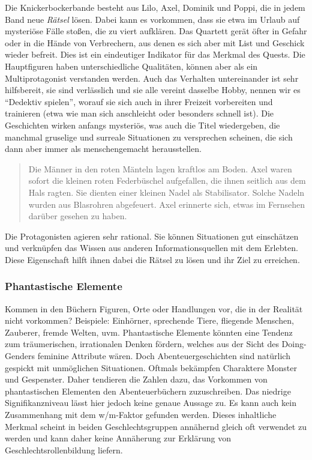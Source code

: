 Die Knickerbockerbande besteht aus Lilo, Axel, Dominik und Poppi, die in
jedem Band neue \emph{Rätsel} lösen. Dabei kann es vorkommen, dass sie
etwa im Urlaub auf mysteriöse Fälle stoßen, die zu viert aufklären. Das
Quartett gerät öfter in Gefahr oder in die Hände von Verbrechern, aus
denen es sich aber mit List und Geschick wieder befreit. Dies ist ein
eindeutiger Indikator für das Merkmal des Quests. Die Hauptfiguren haben
unterschiedliche Qualitäten, können aber als ein Multiprotagonist
verstanden werden. Auch das Verhalten untereinander ist sehr
hilfsbereit, sie sind verlässlich und sie alle vereint dasselbe Hobby,
nennen wir es ``Dedektiv spielen'', worauf sie sich auch in ihrer
Freizeit vorbereiten und trainieren (etwa wie man sich anschleicht oder
besonders schnell ist). Die Geschichten wirken anfangs mysteriös, was
auch die Titel wiedergeben, die manchmal gruselige und surreale
Situationen zu versprechen scheinen, die sich dann aber immer als
menschengemacht herausstellen.

\begin{quote}
Die Männer in den roten Mänteln lagen kraftlos am Boden. \textelp{} Axel
waren sofort die kleinen roten Federbüschel aufgefallen, die ihnen
seitlich aus dem Hals ragten. Sie dienten einer kleinen Nadel als
Stabilisator. Solche Nadeln wurden aus Blasrohren abgefeuert. Axel
erinnerte sich, etwas im Fernsehen darüber gesehen zu haben.
\parencite[][117]{Brezina2010}
\end{quote}

Die Protagonisten agieren sehr rational. Sie können Situationen gut
einschätzen und verknüpfen das Wissen aus anderen Informationsquellen
mit dem Erlebten. Diese Eigenschaft hilft ihnen dabei die Rätsel zu
lösen und ihr Ziel zu erreichen.

\subsubsection{Phantastische Elemente}

Kommen in den Büchern Figuren, Orte oder Handlungen vor, die in der
Realität nicht vorkommen? Beispiele: Einhörner, sprechende Tiere,
fliegende Menschen, Zauberer, fremde Welten, uvm. Phantastische Elemente
könnten eine Tendenz zum träumerischen, irrationalen Denken fördern,
welches aus der Sicht des Doing-Genders feminine Attribute wären. Doch
Abenteuergeschichten sind natürlich gespickt mit unmöglichen
Situationen. Oftmals bekämpfen Charaktere Monster und Gespenster. Daher
tendieren die Zahlen dazu, das Vorkommen von phantastischen Elementen
den Abenteuerbüchern zuzuschreiben. Das niedrige Signifikanzniveau lässt
hier jedoch keine genaue Aussage zu. Es kann auch kein Zusammenhang mit
dem w/m-Faktor gefunden werden. Dieses inhaltliche Merkmal scheint in
beiden Geschlechtsgruppen annähernd gleich oft verwendet zu werden und
kann daher keine Annäherung zur Erklärung von Geschlechtsrollenbildung
liefern.

